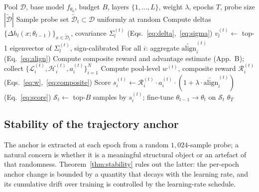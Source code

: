 \begin{algorithm}[t]
\caption{Trajectory-Anchored Dynamic Selection (TADS)}
\label{alg:tads}
\begin{algorithmic}[1]
\REQUIRE Pool $\mathcal{D}$, base model $f_{\theta_0}$, budget $B$,
         layers $\{1,\ldots,L\}$, weight $\lambda$, epochs $T$,
         probe size $|\widetilde{\mathcal{D}}|$
  \STATE Sample probe set
         $\widetilde{\mathcal{D}}_t \subset \mathcal{D}$ uniformly at random
    \STATE Compute deltas
           $\{\Delta h_l(x; \theta_{t-1})\}_{x \in \widetilde{\mathcal{D}}_t}$,
           covariance $\Sigma_l^{(t)}$
           \hfill (Eqs.~\ref{eq:delta},~\ref{eq:sigma})
    \STATE $v_l^{(t)} \leftarrow$ top-1 eigenvector of $\Sigma_l^{(t)}$,
           sign-calibrated
  \ENDFOR
  \STATE For all $i$: aggregate
         $\widetilde{\mathrm{align}}_i^{(t)}$
         \hfill (Eq.~\ref{eq:align})
  \STATE Compute composite reward and advantage estimate (App.~B); collect
         $\{\mathcal{L}_i^{(t)}, \mathcal{H}_i^{(t)}, a_i^{(t)}\}_{i=1}^N$
  \STATE Compute pool-level $w^{(t)}$, composite reward
         $\mathcal{R}_i^{(t)}$
         \hfill (Eqs.~\ref{eq:w},~\ref{eq:composite})
  \STATE Score
         $s_i^{(t)} \leftarrow
          \mathcal{R}_i^{(t)} \cdot a_i^{(t)} \cdot
          (1 + \lambda \cdot \widetilde{\mathrm{align}}_i^{(t)})$
         \hfill (Eq.~\ref{eq:score})
  \STATE $\mathcal{S}_t \leftarrow$ top-$B$ samples by $s_i^{(t)}$;
         fine-tune $\theta_{t-1} \to \theta_t$ on $\mathcal{S}_t$
\ENDFOR
\RETURN $\theta_T$
\end{algorithmic}
\end{algorithm}

\subsection{Stability of the trajectory anchor}
\label{sec:method-theory}

The anchor is extracted at each epoch from a random $1{,}024$-sample
probe; a natural concern is whether it is a meaningful structural
object or an artefact of that randomness. Theorem~\ref{thm:stability}
rules out the latter: the per-epoch anchor change is bounded by a
quantity that decays with the learning rate, and its cumulative
drift over training is controlled by the learning-rate schedule.

